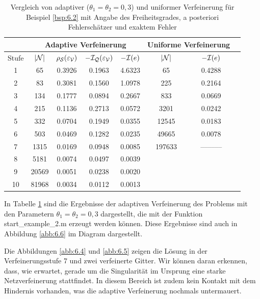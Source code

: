 \begin{bsp}
\begin{table}[h]
\centering
\begin{tabular}[c]{|c|c|c|c|c|c|c|c|}
	\hline
	 & \multicolumn{4}{c|}{Adaptive Verfeinerung} & \multicolumn{2}{c|}{Uniforme Verfeinerung} \\
	\hline
	Stufe & $\lvert \mathcal N\rvert$ & $\rho_{\mathcal S}(\varepsilon_{\mathcal V})$ & $-\mathcal I_{\mathcal Q} (\varepsilon_{\mathcal V})$ & $-\mathcal I(e)$ & $\lvert \mathcal N\rvert$ & $-\mathcal I (e)$ \\
	\hline
	 1 &  65  & 0.3926 & 0.1963 & 4.6323 & 65 & 0.4288 \\
	 2 & 83 & 0.3081 & 0.1560 & 1.0978 & 225 & 0.2164 \\
	 3 & 134 & 0.1777 & 0.0894 & 0.2667 & 833 & 0.0669  \\
	 4 & 215 & 0.1136 &0.2713 & 0.0572 & 3201 & 0.0242 \\
	 5 & 332 & 0.0704 & 0.1949 & 0.0355 & 12545 & 0.0183 \\
	 6 & 503 & 0.0469 & 0.1282 & 0.0235 & 49665 & 0.0078 \\
	 7 & 1315 & 0.0169 & 0.0948 & 0.0085 & 197633 & ––––––  \\
	 8 & 5181 & 0.0074 & 0.0497 & 0.0039 &  &  \\
	 9 & 20569 & 0.0051 & 0.0238 & 0.0020 & & \\
	 10 & 81968 & 0.0034 & 0.0112 & 0.0013 & & \\
	\hline
\end{tabular}
\caption[Vergleich von adaptiver und uniformer Verfeinerung für Beispiel \ref{bsp:6.2}]{\label{tab:6.2}Vergleich von adaptiver ($\theta_1 = \theta_2 = 0,3$) und uniformer Verfeinerung für Beispiel \ref{bsp:6.2} mit Angabe des Freiheitsgrades, a posteriori Fehlerschätzer und exaktem Fehler}
\end{table}

In Tabelle \ref{tab:6.2} sind die Ergebnisse der adaptiven Verfeinerung des Problems mit den Parametern $\theta_1 = \theta_2=0,3$ dargestellt, die mit der Funktion {\ttfamily start_example_2.m} erzeugt werden können. Diese Ergebnisse sind auch in Abbildung \ref{abb:6.6} im Diagram dargestellt.

Die Abbildungen \ref{abb:6.4} und \ref{abb:6.5} zeigen die Lösung in der Verfeinerungsstufe 7 und zwei verfeinerte Gitter. Wir können daran erkennen, dass, wie erwartet, gerade um die Singularität im Ursprung eine starke Netzverfeinerung stattfindet. In diesem Bereich ist zudem kein Kontakt mit dem Hindernis vorhanden, was die adaptive Verfeinerung nochmals untermauert.


\end{bsp}
